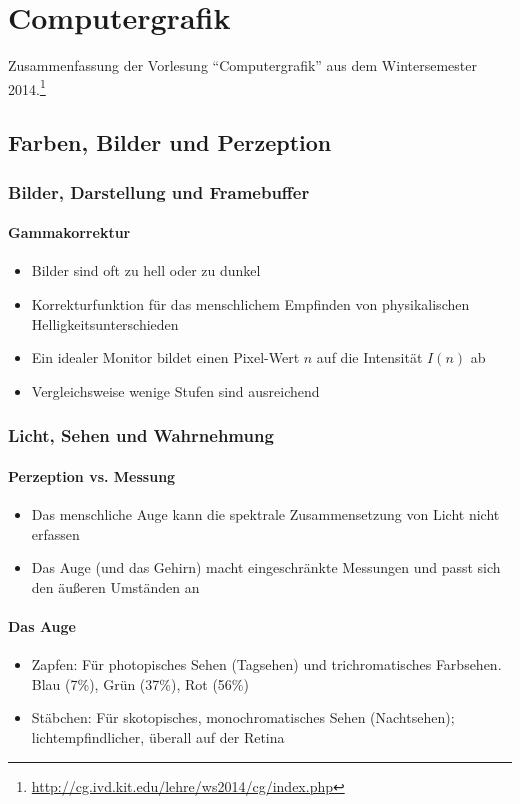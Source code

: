 \chapter{Computergrafik}

Zusammenfassung der Vorlesung "`Computergrafik"' aus dem Wintersemester 2014.\footnote{\url{http://cg.ivd.kit.edu/lehre/ws2014/cg/index.php}}

\section{Farben, Bilder und Perzeption}

\subsection{Bilder, Darstellung und Framebuffer}

\subsubsection{Gammakorrektur}
\begin{itemize}
	\item Bilder sind oft zu hell oder zu dunkel
	\item Korrekturfunktion für das menschlichem Empfinden von physikalischen Helligkeitsunterschieden
	\item Ein idealer Monitor bildet einen Pixel-Wert \(n\) auf die Intensität \(I(n)\) ab
	\item Vergleichsweise wenige Stufen sind ausreichend
\end{itemize}


\subsection{Licht, Sehen und Wahrnehmung}

\subsubsection{Perzeption vs. Messung}
\begin{itemize}
	\item Das menschliche Auge kann die spektrale Zusammensetzung von Licht nicht erfassen
	\item Das Auge (und das Gehirn) macht eingeschränkte Messungen und passt sich den äußeren Umständen an
\end{itemize}

\subsubsection{Das Auge}
\begin{itemize}
	\item Zapfen: Für photopisches Sehen (Tagsehen) und trichromatisches Farbsehen. Blau (7\%), Grün (37\%), Rot (56\%)
	\item Stäbchen: Für skotopisches, monochromatisches Sehen (Nachtsehen); lichtempfindlicher, überall auf der Retina
\end{itemize}


